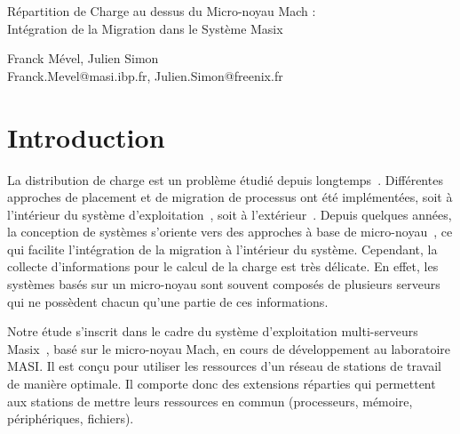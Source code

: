 \documentclass[11pt,a4paper]{article}
\begin{document}

\begin{center}
{\Large
Répartition de Charge au dessus du Micro-noyau Mach : \\ 
Intégration de la Migration dans le Système Masix
}

Franck Mével, Julien Simon \\
Franck.Mevel@masi.ibp.fr, Julien.Simon@freenix.fr
\end{center}
\newcommand {\figps} [4]
{
    \begin {figure} [htbp]
        \begin {center}
                \texttt{[image: \#1.ps]}
        \end {center}
        \caption {#4}
        \label {fig:#1}
    \end {figure}
}

\newcommand {\mysection} [1]
{
	\vspace {-5mm}
	\section* {#1}
	\vspace {-3mm}
}

\newcommand {\myitem}
{
	\vspace {-2mm}
	\item
}

\mysection{Introduction}
La distribution de charge est un problème étudié depuis longtemps~\cite{distributed:ancetreMigration}. Différentes approches de placement et de migration de processus ont été implémentées, soit à l'intérieur du système d'exploitation~\cite{distributed:SpriteMigration}, soit à l'extérieur~\cite{distributed:gatostar}. 
Depuis quelques années, la conception de systèmes s'oriente vers des approches à base de micro-noyau~\cite{mach:foundation,distributed:AmoebaOverview,distributed:overviewchorus}, ce qui facilite l'intégration de la migration à l'intérieur du système.
Cependant, la collecte d'informations pour le calcul de la charge est très délicate. 
En effet,
les systèmes basés sur un micro-noyau sont souvent composés de plusieurs serveurs qui ne possèdent chacun qu'une partie de ces informations.

Notre étude s'inscrit dans le cadre du système d'exploitation multi-serveurs Masix~\cite{masix:osf}, basé sur le micro-noyau Mach, en cours de développement au laboratoire 
MASI. 
Il est conçu pour utiliser les ressources d'un réseau de stations de travail de manière optimale. Il comporte donc des extensions réparties qui permettent aux stations de mettre leurs ressources en commun (processeurs, mémoire, périphériques, fichiers).
\end{document}
